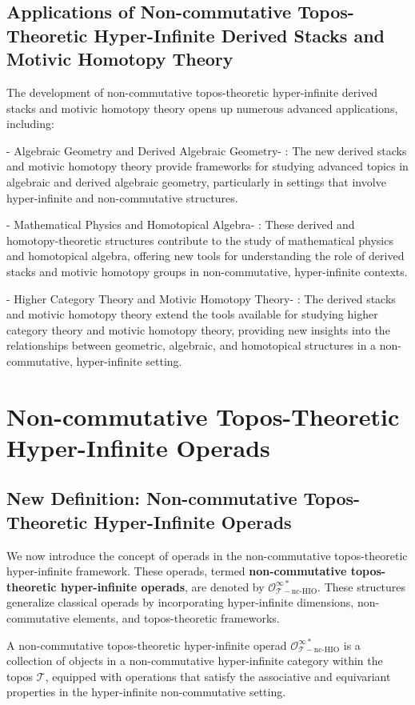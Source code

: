 \documentclass{article}
\begin{document}
\subsection{Applications of Non-commutative Topos-Theoretic Hyper-Infinite Derived Stacks and Motivic Homotopy Theory}
The development of non-commutative topos-theoretic hyper-infinite derived stacks and motivic homotopy theory opens up numerous advanced applications, including:

-  Algebraic Geometry and Derived Algebraic Geometry- : The new derived stacks and motivic homotopy theory provide frameworks for studying advanced topics in algebraic and derived algebraic geometry, particularly in settings that involve hyper-infinite and non-commutative structures.

-  Mathematical Physics and Homotopical Algebra- : These derived and homotopy-theoretic structures contribute to the study of mathematical physics and homotopical algebra, offering new tools for understanding the role of derived stacks and motivic homotopy groups in non-commutative, hyper-infinite contexts.

-  Higher Category Theory and Motivic Homotopy Theory- : The derived stacks and motivic homotopy theory extend the tools available for studying higher category theory and motivic homotopy theory, providing new insights into the relationships between geometric, algebraic, and homotopical structures in a non-commutative, hyper-infinite setting.



\section{Non-commutative Topos-Theoretic Hyper-Infinite Operads}
\subsection{New Definition: Non-commutative Topos-Theoretic Hyper-Infinite Operads}
We now introduce the concept of operads in the non-commutative topos-theoretic hyper-infinite framework. These operads, termed \textbf{non-commutative topos-theoretic hyper-infinite operads}, are denoted by \(\mathcal{O}_{\mathcal{T}-\text{nc-HIO}}^{\infty *}\). These structures generalize classical operads by incorporating hyper-infinite dimensions, non-commutative elements, and topos-theoretic frameworks.

A non-commutative topos-theoretic hyper-infinite operad \(\mathcal{O}_{\mathcal{T}-\text{nc-HIO}}^{\infty *}\) is a collection of objects in a non-commutative hyper-infinite category within the topos \(\mathcal{T}\), equipped with operations that satisfy the associative and equivariant properties in the hyper-infinite non-commutative setting.
\end{document}
